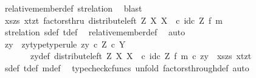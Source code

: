\begin{isabellebody}
\ relative{\isacharunderscore}{\kern0pt}member{\isacharunderscore}{\kern0pt}def{}\ st{\isacharunderscore}{\kern0pt}relation\ \isamarkupfalse%
\ blast\isanewline
\isanewline
\ \ \ \ \isamarkupfalse%
\ {\isachardoublequoteopen}{\isasymlangle}{\isasymlangle}xs{\isacharcomma}{\kern0pt}zs{\isasymrangle}{\isacharcomma}{\kern0pt}\ {\isasymlangle}xt{\isacharcomma}{\kern0pt}zt{\isasymrangle}{\isasymrangle}\ factorsthru\ {\isacharparenleft}{\kern0pt}distribute{\isacharunderscore}{\kern0pt}left\ Z\ X\ X\ \ {\isasymcirc}\isactrlsub c\ {\isacharparenleft}{\kern0pt}id\isactrlsub c\ Z\ {\isasymtimes}\isactrlsub f\ m{\isacharparenright}{\kern0pt}{\isacharparenright}{\kern0pt}{\isachardoublequoteclose}\isanewline
\ \ \ \ \ \ \isamarkupfalse%
\ st{\isacharunderscore}{\kern0pt}relation\ s{\isacharunderscore}{\kern0pt}def\ t{\isacharunderscore}{\kern0pt}def\ \isamarkupfalse%
\ relative{\isacharunderscore}{\kern0pt}member{\isacharunderscore}{\kern0pt}def{}\ \isamarkupfalse%
\ auto\isanewline
\ \ \ \ \isamarkupfalse%
\ \isamarkupfalse%
\ zy\ \ zy{\isacharunderscore}{\kern0pt}type{\isacharbrackleft}{\kern0pt}type{\isacharunderscore}{\kern0pt}rule{\isacharbrackright}{\kern0pt}{\isacharcolon}{\kern0pt}\ {\isachardoublequoteopen}zy\ {\isasymin}\isactrlsub c\ Z\ {\isasymtimes}\isactrlsub c\ Y{\isachardoublequoteclose}\isanewline
\ \ \ \ \ \ \ zy{\isacharunderscore}{\kern0pt}def{\isacharcolon}{\kern0pt}\ {\isachardoublequoteopen}{\isacharparenleft}{\kern0pt}distribute{\isacharunderscore}{\kern0pt}left\ Z\ X\ X\ \ {\isasymcirc}\isactrlsub c\ {\isacharparenleft}{\kern0pt}id\isactrlsub c\ Z\ {\isasymtimes}\isactrlsub f\ m{\isacharparenright}{\kern0pt}{\isacharparenright}{\kern0pt}\ {\isasymcirc}\isactrlsub c\ zy\ {\isacharequal}{\kern0pt}\ {\isasymlangle}{\isasymlangle}xs{\isacharcomma}{\kern0pt}zs{\isasymrangle}{\isacharcomma}{\kern0pt}\ {\isasymlangle}xt{\isacharcomma}{\kern0pt}zt{\isasymrangle}{\isasymrangle}{\isachardoublequoteclose}\isanewline
\ \ \ \ \ \ \isamarkupfalse%
\ s{\isacharunderscore}{\kern0pt}def\ t{\isacharunderscore}{\kern0pt}def\ m{\isacharunderscore}{\kern0pt}def\ \isamarkupfalse%
\ {\isacharparenleft}{\kern0pt}typecheck{\isacharunderscore}{\kern0pt}cfuncs{\isacharcomma}{\kern0pt}\ unfold\ factors{\isacharunderscore}{\kern0pt}through{\isacharunderscore}{\kern0pt}def{}{\isacharcomma}{\kern0pt}\ auto{\isacharparenright}{\kern0pt}\isanewline
\ \ \ \ \isamarkupfalse%

\end{isabellebody}
